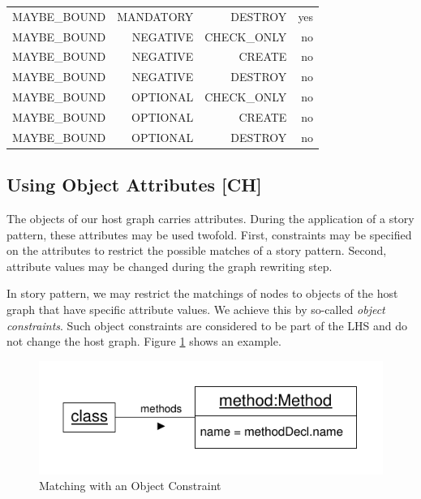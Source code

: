 \begin{table}[htbp]
\begin{tabular}{|r|r|r|r|}
    MAYBE\_BOUND & MANDATORY & DESTROY & yes \\
    MAYBE\_BOUND & NEGATIVE & CHECK\_ONLY & no \\
    MAYBE\_BOUND & NEGATIVE & CREATE & no \\
    MAYBE\_BOUND & NEGATIVE & DESTROY & no \\
    MAYBE\_BOUND & OPTIONAL & CHECK\_ONLY & no \\
    MAYBE\_BOUND & OPTIONAL & CREATE & no \\
    MAYBE\_BOUND & OPTIONAL & DESTROY & no \\
    \hline
    \end{tabular}%
  \label{tab:bindingCombinations}%
\end{table}%


\subsection{Using Object Attributes [CH]}

The objects of our host graph carries attributes. During the application of a story pattern, these attributes may be used twofold. First, constraints may be specified on the attributes to restrict the possible matches of a story pattern. Second, attribute values may be changed during the graph rewriting step.

In story pattern, we may restrict the matchings of nodes to objects of the host graph that have specific attribute values. We achieve this by so-called \emph{object constraints}. Such object constraints are considered to be part of the LHS and do not change the host graph. Figure \ref{fig:objectConstraint} shows an example.

\begin{figure}[htbp]
  \centering
  \includegraphics[scale=1]{figures/ObjectConstraint}
  \caption{Matching with an Object Constraint}
  \label{fig:objectConstraint}
\end{figure}

